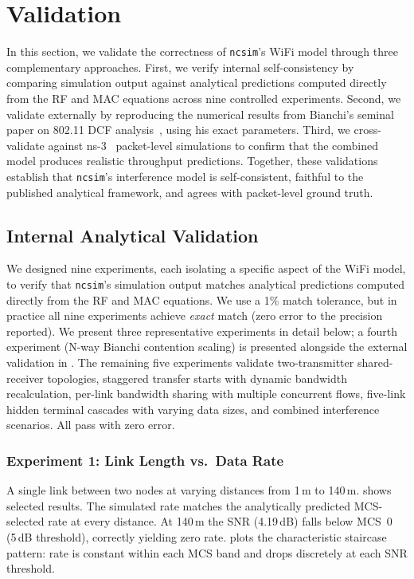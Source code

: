 \documentclass[conference]{IEEEtran}
\newcommand{\ncsim}{\texttt{ncsim}}
\begin{document}
\section{Validation}
\label{sec:validation}

In this section, we validate the correctness of \ncsim{}'s WiFi model
through three complementary approaches.  First, we verify internal
self-consistency by comparing simulation output against analytical
predictions computed directly from the RF and MAC equations across nine
controlled experiments.  Second, we validate externally by reproducing the
numerical results from Bianchi's seminal paper on 802.11 DCF
analysis~\cite{bianchi2000}, using his exact parameters.  Third, we
cross-validate against ns-3~\cite{ns3} packet-level simulations to confirm
that the combined model produces realistic throughput predictions.
Together, these validations establish that \ncsim{}'s interference model is
self-consistent, faithful to the published analytical framework, and
agrees with packet-level ground truth.

\subsection{Internal Analytical Validation}
\label{sec:internal_val}

We designed nine experiments, each isolating a specific aspect of the
WiFi model, to verify that \ncsim{}'s simulation output matches
analytical predictions computed directly from the RF and MAC equations.
We use a 1\% match tolerance, but in practice all nine experiments
achieve \emph{exact} match (zero error to the precision reported).
We present three representative experiments in detail below; a fourth
experiment (N-way Bianchi contention scaling) is presented alongside
the external validation in .  The remaining
five experiments validate two-transmitter shared-receiver topologies,
staggered transfer starts with dynamic bandwidth recalculation,
per-link bandwidth sharing with multiple concurrent flows, five-link
hidden terminal cascades with varying data sizes, and combined
interference scenarios.  All pass with zero error.

\subsubsection{Experiment 1: Link Length vs.\ Data Rate}

A single link between two nodes at varying distances from 1\,m to 140\,m.
 shows selected results.  The simulated rate matches the
analytically predicted MCS-selected rate at every distance.  At 140\,m the
SNR (4.19\,dB) falls below MCS~0 (5\,dB threshold), correctly yielding zero
rate.   plots the characteristic staircase pattern: rate
is constant within each MCS band and drops discretely at each SNR threshold.
\end{document}
